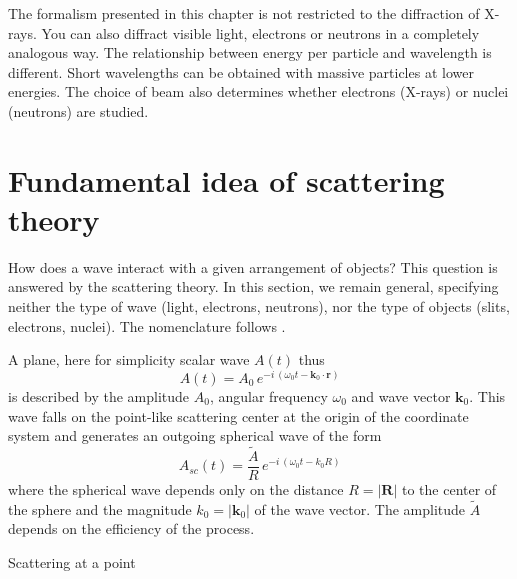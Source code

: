 The formalism presented in this chapter is not restricted to the diffraction of X-rays. You can also diffract visible light, electrons or neutrons in a completely analogous way. The relationship between energy per particle and wavelength is different. Short wavelengths can be obtained with massive particles at lower energies.  The choice of beam also determines whether  electrons (X-rays) or nuclei (neutrons) are studied.

\section{Fundamental idea of scattering theory}

How does a wave interact with a given arrangement of objects? This question is answered by the scattering theory. In this section, we remain general, specifying neither the type of wave (light, electrons, neutrons), nor the type of objects (slits, electrons, nuclei). The nomenclature follows \cite{Hunklinger2014}.

A plane, here for simplicity scalar wave $A(t)$ thus
\begin{equation}
 A(t) = A_0 \, e^{- i \, (\omega_0 t - \mathbf{k}_0 \cdot \mathbf{r})}
\end{equation}
is described by the amplitude $A_0$, angular frequency $\omega_0$ and wave vector $\mathbf{k}_0$. This wave falls on the point-like scattering center at the origin of the coordinate system and generates  an outgoing spherical wave of the form
\begin{equation}
 A_{sc}(t) = \frac{\tilde{A}}{R} \, e^{- i \, (\omega_0 t - k_0 R)}
\end{equation}
where the spherical wave depends only on the distance $R = |\mathbf{R}|$ to the center of the sphere and the magnitude $k_0 = | \mathbf{k}_0| $ of the wave vector. The amplitude $\tilde{A}$ depends on the efficiency of the process.

\begin{marginfigure}
\caption{Scattering at a point}
\end{marginfigure}

